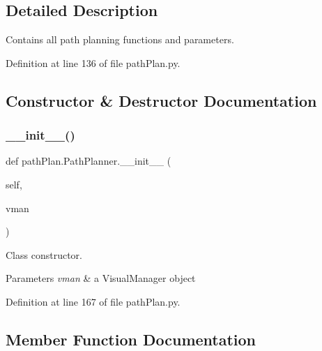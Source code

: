\subsection{Detailed Description}
Contains all path planning functions and parameters. 

Definition at line 136 of file path\+Plan.\+py.



\subsection{Constructor \& Destructor Documentation}
\mbox{\label{classpath_plan_1_1_path_planner_a4725d91c2d54372bbfecfce0a71a3552}} 
\subsubsection{\texorpdfstring{\+\_\+\+\_\+init\+\_\+\+\_\+()}{\_\_init\_\_()}}
{\footnotesize\ttfamily def path\+Plan.\+Path\+Planner.\+\_\+\+\_\+init\+\_\+\+\_\+ (\begin{DoxyParamCaption}\item[{}]{self,  }\item[{}]{vman }\end{DoxyParamCaption})}



Class constructor. 


\begin{DoxyParams}{Parameters}
{\em vman} & a Visual\+Manager object \\
\hline
\end{DoxyParams}


Definition at line 167 of file path\+Plan.\+py.



\subsection{Member Function Documentation}
\mbox{\label{classpath_plan_1_1_path_planner_aa578a0dcb25eed4782bb660d8b71b731}} 
